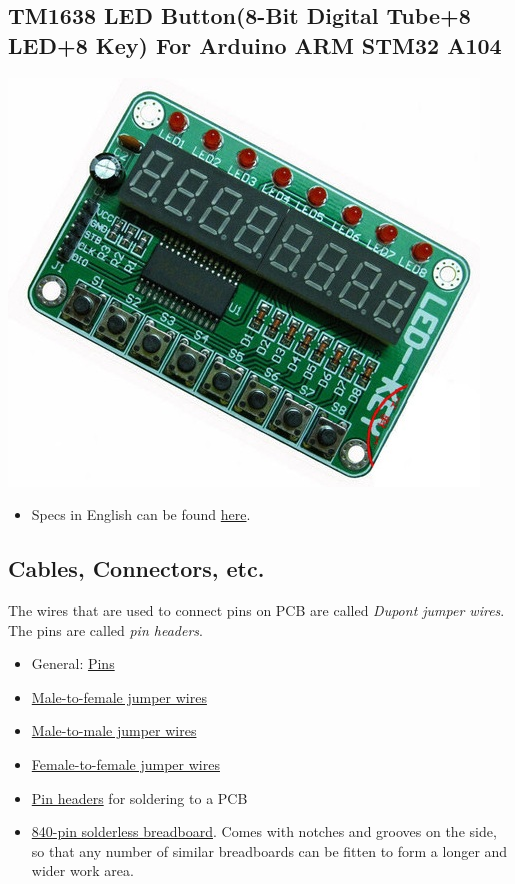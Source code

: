 \documentclass[11pt]{article}
\begin{document}
\subsection{TM1638 LED Button(8-Bit Digital Tube+8 LED+8 Key) For Arduino ARM STM32 A104}
\label{sec-4-10}
\includegraphics[width=.9\linewidth]{./files/led-shield.jpg}

\begin{itemize}
\item Specs in English can be found \href{http://tronixstuff.wordpress.com/2012/03/11/arduino-and-tm1638-led-display-modules/}{here}.
\end{itemize}
\subsection{Cables, Connectors, etc.}
\label{sec-4-11}

The wires that are used to connect pins on PCB are called \emph{Dupont jumper wires}. The pins are called \emph{pin headers}. 

\begin{itemize}
\item General: \href{http://dx.com/s/electronic+pins.html?category=410&PageSize=60}{Pins}
\item \href{http://dx.com/p/male-to-female-dupont-breadboard-jumper-wires-for-arduino-40-piece-pack-20cm-length-146935}{Male-to-female jumper wires}
\item \href{http://dx.com/p/arduino-compatible-breadboard-jumper-wires-8-20cm-68-cable-pack-142221}{Male-to-male jumper wires}
\item \href{http://dx.com/p/arduino-dupont-4-pin-female-to-female-extension-wire-cable-40cm-10-piece-pack-140526}{Female-to-female jumper wires}
\item \href{http://dx.com/p/single-row-40-pin-2-00mm-pitch-pin-headers-200-piece-pack-139825}{Pin headers} for soldering to a PCB
\item \href{http://dx.com/p/840-point-solderless-breadboard-118355}{840-pin solderless breadboard}. Comes with notches and grooves on the side, so that any number of similar breadboards can be fitten to form a longer and wider work area.
\end{itemize}
\end{document}
